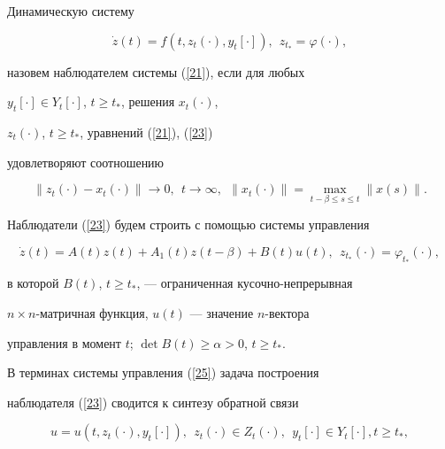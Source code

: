 \begin{defns}


Динамическую систему


\begin{equation}\label{23}


\Dot z (t)=f(t,z_t(\cdot), y_t[\cdot]),\ \ z_{t_*}=\varphi (\cdot),


\end{equation}


назовем наблюдателем системы (\ref{21}), если для любых


$y_{t}[\cdot] \in Y_{t}[\cdot]$, $t \ge t_*$, решения $x_t(\cdot)$,


$z_t(\cdot)$, $t \ge t_*$, уравнений (\ref{21}), (\ref{23})


удовлетворяют соотношению


\begin{equation}\label{24}


\|z_t(\cdot)-x_{t}(\cdot)\| \rightarrow 0,\ \ t \rightarrow \infty,


\ \ \|x_{t}(\cdot)\|=\max_{t-\beta \le s \le t}\|x(s)\|.


\end{equation}


\end{defns}





Наблюдатели (\ref{23}) будем строить с помощью системы управления


\begin{equation}\label{25}


\Dot z(t)=A(t)z(t)+A_1(t)z(t-\beta)+B(t)u(t),


\ \ z_{t_*}(\cdot)=\varphi_{t_*}(\cdot),


\end{equation}


в которой $B(t)$, $t \ge t_{*}$, --- ограниченная кусочно-непрерывная


$n \times n$-матричная функция, $u(t)$ --- значение $n$-вектора 


управления в момент $t$; $\det B(t) \ge \alpha >0$, $t \ge t_*$.





В терминах системы управления (\ref{25}) задача построения


наблюдателя (\ref{23}) сводится к синтезу обратной связи


\begin{equation}\label{26}


u=u(t,z_t(\cdot), y_t[\cdot]),\ \ z_{t}(\cdot) \in Z_{t}(\cdot),


\ \ y_{t}[\cdot] \in Y_{t}[\cdot], t \ge t_{*},


\end{equation}


